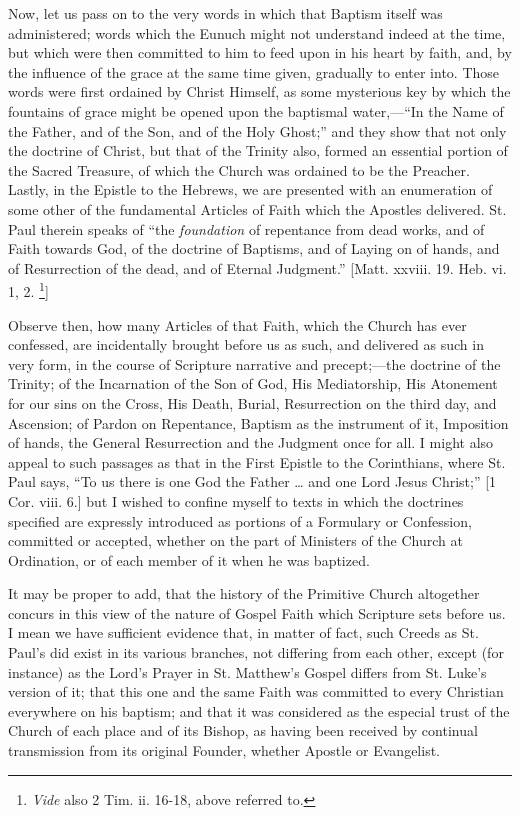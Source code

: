 Now, let us pass on to the very words in which that Baptism itself
was administered; words which the Eunuch might not understand indeed at
the time, but which were then committed to him to feed upon in his heart
by faith, and, by the influence of the grace at the same time given,
gradually to enter into. Those words were first ordained by Christ
Himself, as some mysterious key by which the fountains of grace might be
opened upon the baptismal water,—``In the Name of the Father, and
of the Son, and of the Holy Ghost;'' and they show that not only the
doctrine of Christ, but that of the Trinity also, formed an essential
portion of the Sacred Treasure, of which the Church was ordained to be
the Preacher. Lastly, in the Epistle to the Hebrews, we are presented
with an enumeration of some other of the fundamental Articles of Faith
which the Apostles delivered. St. Paul therein speaks of ``the \emph{foundation}
of repentance from dead works, and of Faith towards God, of the doctrine
of Baptisms, and of Laying on of hands, and of Resurrection of the dead,
and of Eternal Judgment.'' [Matt. xxviii. 19. Heb. vi. 1, 2. \footnote{\emph{Vide} also 2 Tim. ii. 16-18, above
referred to.}]

Observe then, how many Articles of that Faith, which the Church has
ever confessed, are incidentally brought before us as such, and
delivered as such in very form, in the course of Scripture narrative and
precept;—the doctrine of the Trinity; of the Incarnation of the Son of
God, His Mediatorship, His Atonement for our sins on the Cross, His
Death, Burial, Resurrection on the third day, and Ascension; of Pardon
on Repentance, Baptism as the instrument of it, Imposition of hands, the
General Resurrection and the Judgment once for all. I might also appeal
to such passages as that in the First Epistle to the Corinthians, where
St. Paul says, ``To us there is one God the Father … and one Lord
Jesus Christ;'' [1 Cor. viii. 6.] but I wished to confine myself to
texts in which the doctrines specified are expressly introduced as
portions of a Formulary or Confession, committed or accepted, whether on
the part of Ministers of the Church at Ordination, or of each member of
it when he was baptized.

It may be proper to add, that the history of the Primitive Church
altogether concurs in this view of the nature of Gospel Faith which
Scripture sets before us. I mean we have sufficient evidence that, in
matter of fact, such Creeds as St. Paul's did exist in its various
branches, not differing from each other, except (for instance) as the
Lord's Prayer in St. Matthew's Gospel differs from St. Luke's version of
it; that this one and the same Faith was committed to every Christian
everywhere on his baptism; and that it was considered as the especial
trust of the Church of each place and of its Bishop, as having been
received by continual transmission from its original Founder, whether
Apostle or Evangelist.

